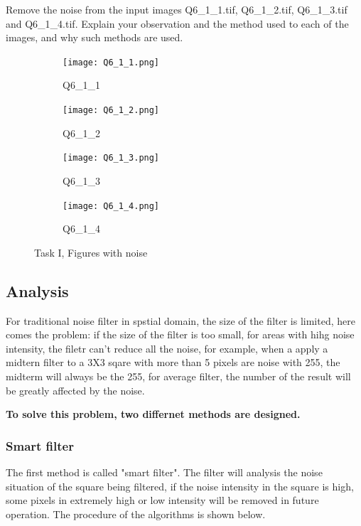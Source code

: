 \documentclass[
	12pt, %
]{style/fphw}
\begin{document}
\begin{problem}
	Remove the noise from the input images Q6\_1\_1.tif, Q6\_1\_2.tif, Q6\_1\_3.tif and Q6\_1\_4.tif. Explain your observation and the method used to each of the images, and why such methods are used.

	\begin{figure}[H]
		\centering
		\begin{subfigure}[b]{.24\textwidth}
			\centering
			\texttt{[image: Q6\_1\_1.png]}
			\caption{Q6\_1\_1}
			\label{Q6_1_1}
		\end{subfigure}
		\hfill
		\begin{subfigure}[b]{.24\textwidth}
			\centering
			\texttt{[image: Q6\_1\_2.png]}
			\caption{Q6\_1\_2}
			\label{Q6_1_2}
		\end{subfigure}
		\hfill
		\begin{subfigure}[b]{.24\textwidth}
			\centering
			\texttt{[image: Q6\_1\_3.png]}
			\caption{Q6\_1\_3}
			\label{Q6_1_3}
		\end{subfigure}
		\hfill
		\begin{subfigure}[b]{.24\textwidth}
			\centering
			\texttt{[image: Q6\_1\_4.png]}
			\caption{Q6\_1\_4}
			\label{Q6_1_4}
		\end{subfigure}
		\caption{Task I, Figures with noise}
    	\label{Task I, Figures with noise}	
	\end{figure}
\end{problem}

\subsection*{Analysis}

	For traditional noise filter in spstial domain, the size of the filter is limited, here comes the problem: if the size of the filter is too small, for areas with hihg noise intensity, the filetr can't reduce all the noise, for example, when a apply a midtern filter to a 3X3 sqare with more than 5 pixels are noise with 255, the midterm will always be the 255, for average filter, the number of the result will be greatly affected by the noise.
	
	\textbf{To solve this problem, two differnet methods are designed.}


	\subsubsection*{Smart filter}
	The first method is called "smart filter". The filter will analysis the noise situation of the square being filtered, if the noise intensity in the square is high, some pixels in extremely high or low intensity will be removed in future operation. The procedure of the algorithms is shown below.
\end{document}
